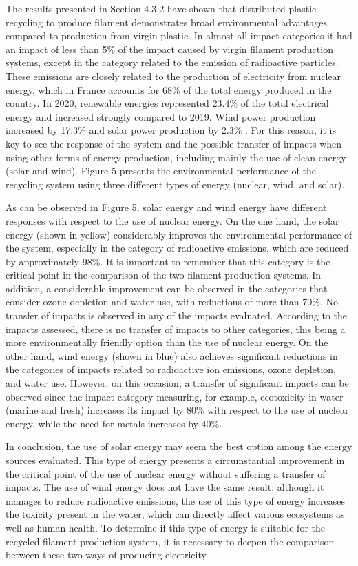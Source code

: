 \documentclass[]{elsarticle} %
\begin{document}
The results presented in Section 4.3.2 have shown that distributed plastic recycling to produce filament demonstrates broad environmental advantages compared to production from virgin plastic. In almost all impact categories it had an impact of less than 5\% of the impact caused by virgin filament production systems, except in the category related to the emission of radioactive particles. These emissions are closely related to the production of electricity from nuclear energy, which in France accounts for 68\% of the total energy produced in the country. In 2020, renewable energies represented 23.4\% of the total electrical energy and increased strongly compared to 2019. Wind power production increased by 17.3\% and solar power production by 2.3\% . For this reason, it is key to see the response of the system and the possible transfer of impacts when using other forms of energy production, including mainly the use of clean energy (solar and wind).
Figure 5 presents the environmental performance of the recycling system using three different types of energy (nuclear, wind, and solar).

As can be observed in Figure 5, solar energy and wind energy have different responses with respect to the use of nuclear energy. On the one hand, the solar energy (shown in yellow) considerably improves the environmental performance of the system, especially in the category of radioactive emissions, which are reduced by approximately 98\%. It is important to remember that this category is the critical point in the comparison of the two filament production systems. In addition, a considerable improvement can be observed in the categories that consider ozone depletion and water use, with reductions of more than 70\%. No transfer of impacts is observed in any of the impacts evaluated. According to the impacts assessed, there is no transfer of impacts to other categories, this being a more environmentally friendly option than the use of nuclear energy. On the other hand, wind energy (shown in blue) also achieves significant reductions in the categories of impacts related to radioactive ion emissions, ozone depletion, and water use. However, on this occasion, a transfer of significant impacts can be observed since the impact category measuring, for example, ecotoxicity in water (marine and fresh) increases its impact by 80\% with respect to the use of nuclear energy, while the need for metals increases by 40\%.

In conclusion, the use of solar energy may seem the best option among the energy sources evaluated. This type of energy presents a circumstantial improvement in the critical point of the use of nuclear energy without suffering a transfer of impacts. The use of wind energy does not have the same result; although it manages to reduce radioactive emissions, the use of this type of energy increases the toxicity present in the water, which can directly affect various ecosystems as well as human health. To determine if this type of energy is suitable for the recycled filament production system, it is necessary to deepen the comparison between these two ways of producing electricity.
\end{document}
